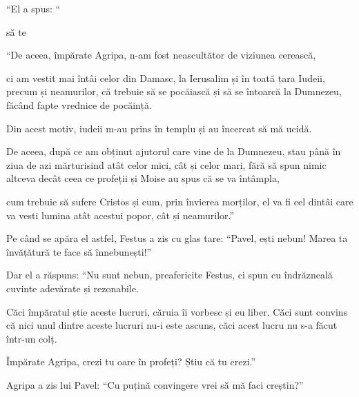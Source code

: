 {\par }{\PP “El a spus: “{}


să te
{}



\par }{\PP {}“De aceea, împărate Agripa, n-am fost neascultător de viziunea cerească,

ci am vestit mai întâi celor din Damasc, la Ierusalim și în toată țara Iudeii, precum și neamurilor, că trebuie să se pocăiască și să se întoarcă la Dumnezeu, făcând fapte vrednice de pocăință.

Din acest motiv, iudeii m-au prins în templu și au încercat să mă ucidă.

De aceea, după ce am obținut ajutorul care vine de la Dumnezeu, stau până în ziua de azi mărturisind atât celor mici, cât și celor mari, fără să spun nimic altceva decât ceea ce profeții și Moise au spus că se va întâmpla,

cum trebuie să sufere Cristos și cum, prin învierea morților, el va fi cel dintâi care va vesti lumina atât acestui popor, cât și neamurilor.”


\par }{\PP {}Pe când se apăra el astfel, Festus a zis cu glas tare: “Pavel, ești nebun! Marea ta învățătură te face să înnebunești!”


\par }{\PP {}Dar el a răspuns: “Nu sunt nebun, preafericite Festus, ci spun cu îndrăzneală cuvinte adevărate și rezonabile.

Căci împăratul știe aceste lucruri, căruia îi vorbesc și eu liber. Căci sunt convins că nici unul dintre aceste lucruri nu-i este ascuns, căci acest lucru nu s-a făcut într-un colț.

Împărate Agripa, crezi tu oare în profeți? Știu că tu crezi.”


\par }{\PP {}Agripa a zis lui Pavel: “Cu puțină convingere vrei să mă faci creștin?”


}
